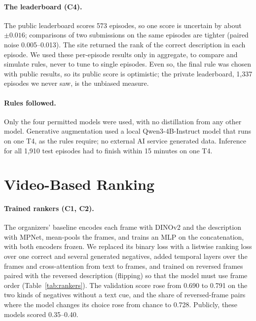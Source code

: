 \documentclass[10pt,twocolumn]{article}
\newcommand{\cha}[1]{\textsf{C#1}}
\begin{document}
\paragraph{The leaderboard (\cha4).} The public leaderboard scores 573 episodes, so one score is uncertain by about
$\pm0.016$; comparisons of two submissions on the same episodes are tighter (paired noise 0.005--0.013). The site
returned the rank of the correct description in each episode. We used these per-episode results only in aggregate,
to compare and simulate rules, never to tune to single episodes. Even so, the final rule was chosen with public
results, so its public score is optimistic; the private leaderboard, 1,337 episodes we never saw, is the unbiased
measure.

\paragraph{Rules followed.} Only the four permitted models were used, with no distillation from any other model.
Generative augmentation used a local Qwen3-4B-Instruct model that runs on one T4, as the rules require; no external
AI service generated data. Inference for all 1,910 test episodes had to finish within 15 minutes on one T4.

\section{Video-Based Ranking}

\paragraph{Trained rankers (\cha1, \cha2).} The organizers' baseline encodes each frame with DINOv2 and the
description with MPNet, mean-pools the frames, and trains an MLP on the concatenation, with both encoders frozen.
We replaced its binary loss with a listwise ranking loss over one correct and several generated negatives, added
temporal layers over the frames and cross-attention from text to frames, and trained on reversed frames paired with
the reversed description (flipping) so that the model must use frame order (Table~\ref{tab:rankers}). The
validation score rose from 0.690 to 0.791 on the two kinds of negatives without a text cue, and the share of
reversed-frame pairs where the model changes its choice rose from chance to 0.728. Publicly, these models scored
0.35--0.40.
\end{document}

